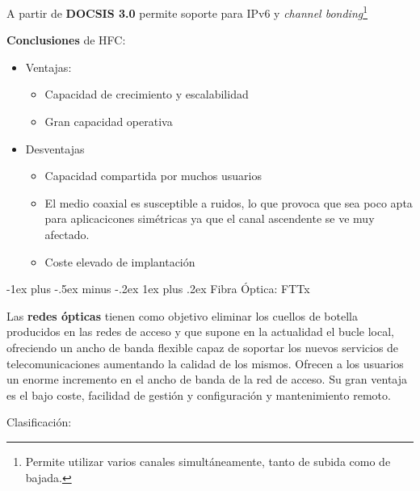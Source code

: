 \documentclass[10pt,portrait, twocolumn]{article}
\makeatletter
\renewcommand{\subsubsection}{\@startsection{subsubsection}{3}{0mm}%
                                {-1ex plus -.5ex minus -.2ex}%
                                {1ex plus .2ex}%
                                {\normalfont\small\bfseries}}
\makeatother
\begin{document}
\quad  A partir de \textbf{DOCSIS 3.0} permite soporte para IPv6 y \textit{channel bonding}\footnote{Permite utilizar varios canales simultáneamente, tanto de subida como de bajada.}

\textbf{Conclusiones} de HFC:

	\begin{itemize}
	\item Ventajas:
		\begin{itemize}
		\item Capacidad de crecimiento y escalabilidad
		\item Gran capacidad operativa
		\end{itemize}
	\item Desventajas
		\begin{itemize}
		\item Capacidad compartida por muchos usuarios
		\item El medio coaxial es susceptible a ruidos, lo  que provoca que sea poco apta para aplicacicones simétricas ya que el canal ascendente se ve muy afectado.
		\item Coste elevado de implantación
		\end{itemize}
	\end{itemize}

\subsubsection{Fibra Óptica: FTTx}

Las \textbf{redes ópticas} tienen como objetivo eliminar los cuellos de botella producidos en las redes de acceso y que supone en la actualidad el bucle local, ofreciendo un ancho de banda flexible capaz de soportar los nuevos servicios de telecomunicaciones aumentando la calidad de los mismos. Ofrecen a los usuarios un enorme incremento en el ancho de banda de la red de acceso. Su gran ventaja es el bajo coste, facilidad de gestión y configuración y mantenimiento remoto.

	\quad Clasificación:
	
\end{document}
